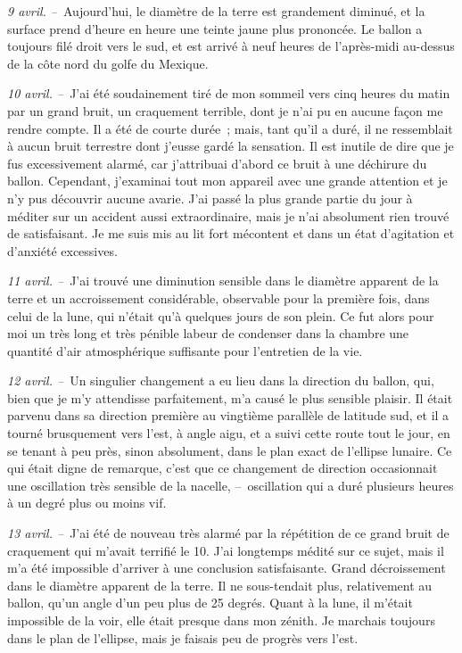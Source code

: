 \documentclass[french,twoside]{book} %
\begin{document}
\emph{9 avril. –} Aujourd’hui, le diamètre de la terre est grandement diminué, et la surface prend d’heure en heure une teinte jaune plus prononcée. Le ballon a toujours filé droit vers le sud, et est arrivé à neuf heures de l’après-midi au-dessus de la côte nord du golfe du Mexique.\par
\emph{10 avril. –} J’ai été soudainement tiré de mon sommeil vers cinq heures du matin par un grand bruit, un craquement terrible, dont je n’ai pu en aucune façon me rendre compte. Il a été de courte durée ; mais, tant qu’il a duré, il ne ressemblait à aucun bruit terrestre dont j’eusse gardé la sensation. Il est inutile de dire que je fus excessivement alarmé, car j’attribuai d’abord ce bruit à une déchirure du ballon. Cependant, j’examinai tout mon appareil avec une grande attention et je n’y pus découvrir aucune avarie. J’ai passé la plus grande partie du jour à méditer sur un accident aussi extraordinaire, mais je n’ai absolument rien trouvé de satisfaisant. Je me suis mis au lit fort mécontent et dans un état d’agitation et d’anxiété excessives.\par
\emph{11 avril. –} J’ai trouvé une diminution sensible dans le diamètre apparent de la terre et un accroissement considérable, observable pour la première fois, dans celui de la lune, qui n’était qu’à quelques jours de son plein. Ce fut alors pour moi un très long et très pénible labeur de condenser dans la chambre une quantité d’air atmosphérique suffisante pour l’entretien de la vie.\par
\emph{12 avril. –} Un singulier changement a eu lieu dans la direction du ballon, qui, bien que je m’y attendisse parfaitement, m’a causé le plus sensible plaisir. Il était parvenu dans sa direction première au vingtième parallèle de latitude sud, et il a tourné brusquement vers l’est, à angle aigu, et a suivi cette route tout le jour, en se tenant à peu près, sinon absolument, dans le plan exact de l’ellipse lunaire. Ce qui était digne de remarque, c’est que ce changement de direction occasionnait une oscillation très sensible de la nacelle, – oscillation qui a duré plusieurs heures à un degré plus ou moins vif.\par
\emph{13 avril. –} J’ai été de nouveau très alarmé par la répétition de ce grand bruit de craquement qui m’avait terrifié le 10. J’ai longtemps médité sur ce sujet, mais il m’a été impossible d’arriver à une conclusion satisfaisante. Grand décroissement dans le diamètre apparent de la terre. Il ne sous-tendait plus, relativement au ballon, qu’un angle d’un peu plus de 25 degrés. Quant à la lune, il m’était impossible de la voir, elle était presque dans mon zénith. Je marchais toujours dans le plan de l’ellipse, mais je faisais peu de progrès vers l’est.\par
\end{document}
